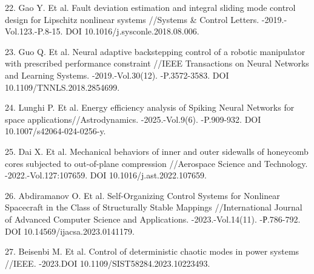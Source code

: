 \begin{refs}
22. Gao Y. Et al. Fault deviation estimation and integral sliding mode
control design for Lipschitz nonlinear systems //Systems \& Control
Letters. -2019.-Vol.123.-P.8-15. DOI 10.1016/j.sysconle.2018.08.006.

23. Guo Q. Et al. Neural adaptive backstepping control of a robotic
manipulator with prescribed performance constraint //IEEE Transactions
on Neural Networks and Learning Systems. -2019.-Vol.30(12).
-P.3572-3583. DOI 10.1109/TNNLS.2018.2854699.

24. Lunghi P. Et al. Energy efficiency analysis of Spiking Neural
Networks for space applications//Astrodynamics. -2025.-Vol.9(6).
-P.909-932. DOI 10.1007/s42064-024-0256-y.

25. Dai X. Et al. Mechanical behaviors of inner and outer sidewalls of
honeycomb cores subjected to out-of-plane compression //Aerospace
Science and Technology. -2022.-Vol.127:107659. DOI
10.1016/j.ast.2022.107659.

26. Abdiramanov O. Et al. Self-Organizing Control Systems for Nonlinear
Spacecraft in the Class of Structurally Stable Mappings //International
Journal of Advanced Computer Science and Applications.
-2023.-Vol.14(11). -Р.786-792. DOI 10.14569/ijacsa.2023.0141179.

27. Beisenbi M. Et al. Control of deterministic chaotic modes in power
systems //IEEE. -2023.DOI 10.1109/SIST58284.2023.10223493.
\end{refs}

